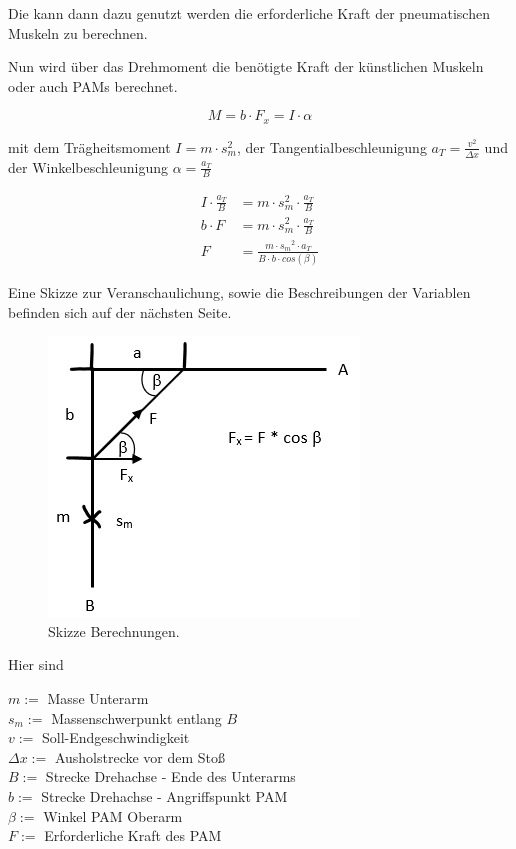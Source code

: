 		Die kann dann dazu genutzt werden die erforderliche Kraft der pneumatischen Muskeln zu berechnen. \par
		Nun wird über das Drehmoment die benötigte Kraft der künstlichen Muskeln oder auch PAMs berechnet. 



		\begin{equation}
			M = b \cdot F_x = I \cdot \alpha%
			\label{eq:DrehmomentArm}
		\end{equation}

		mit dem Trägheitsmoment \( I = m \cdot s_m^2 \), der Tangentialbeschleunigung \( a_T = \frac{v^2}{\Delta x} \) und der
		Winkelbeschleunigung \( \alpha = \frac{a_T}{B} \) \par\medskip

		\begin{align}
			I \cdot \frac{a_T}{B} &= m \cdot s_m^2 \cdot \frac{a_T}{B} \nonumber\\
			b \cdot F &= m \cdot s_m^2 \cdot \frac{a_T}{B} \nonumber\\
			F &=\frac{m \cdot {s_m}^2 \cdot a_T}{B \cdot b \cdot cos(\beta)}%
			\label{eq:Kraft-PAM}
		\end{align}

		Eine Skizze zur Veranschaulichung, sowie die Beschreibungen der Variablen befinden sich auf der nächsten Seite. 

		\newpage
		\begin{figure}[h]
			\centering
			\includegraphics[width=.5\textwidth]{Abb/SkizzeBerechnungen.jpeg}
			\caption{Skizze Berechnungen.}%
			\label{fig:SkizzeBerechnungen}
		\end{figure}

		Hier sind

		\( m := \) Masse Unterarm \\
		\( s_m := \) Massenschwerpunkt entlang $ B $ \\
		\( v := \) Soll-Endgeschwindigkeit \\
		\( \Delta x := \) Ausholstrecke vor dem Stoß \\
		\( B := \) Strecke Drehachse - Ende des Unterarms \\
		\( b:= \) Strecke Drehachse - Angriffspunkt PAM \\
		\( \beta := \) Winkel PAM  Oberarm \\
		\( F:= \) Erforderliche Kraft des PAM

